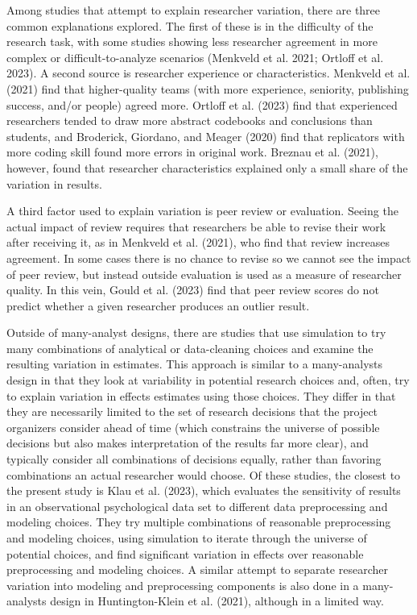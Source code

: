 \documentclass[
  letterpaper,
  DIV=11,
  numbers=noendperiod]{scrartcl}
\begin{document}
Among studies that attempt to explain researcher variation, there are
three common explanations explored. The first of these is in the
difficulty of the research task, with some studies showing less
researcher agreement in more complex or difficult-to-analyze scenarios
(Menkveld et al. 2021; Ortloff et al. 2023). A second source is
researcher experience or characteristics. Menkveld et al. (2021) find
that higher-quality teams (with more experience, seniority, publishing
success, and/or people) agreed more. Ortloff et al. (2023) find that
experienced researchers tended to draw more abstract codebooks and
conclusions than students, and Broderick, Giordano, and Meager (2020)
find that replicators with more coding skill found more errors in
original work. Breznau et al. (2021), however, found that researcher
characteristics explained only a small share of the variation in
results.

A third factor used to explain variation is peer review or evaluation.
Seeing the actual impact of review requires that researchers be able to
revise their work after receiving it, as in Menkveld et al. (2021), who
find that review increases agreement. In some cases there is no chance
to revise so we cannot see the impact of peer review, but instead
outside evaluation is used as a measure of researcher quality. In this
vein, Gould et al. (2023) find that peer review scores do not predict
whether a given researcher produces an outlier result.

Outside of many-analyst designs, there are studies that use simulation
to try many combinations of analytical or data-cleaning choices and
examine the resulting variation in estimates. This approach is similar
to a many-analysts design in that they look at variability in potential
research choices and, often, try to explain variation in effects
estimates using those choices. They differ in that they are necessarily
limited to the set of research decisions that the project organizers
consider ahead of time (which constrains the universe of possible
decisions but also makes interpretation of the results far more clear),
and typically consider all combinations of decisions equally, rather
than favoring combinations an actual researcher would choose. Of these
studies, the closest to the present study is Klau et al. (2023), which
evaluates the sensitivity of results in an observational psychological
data set to different data preprocessing and modeling choices. They try
multiple combinations of reasonable preprocessing and modeling choices,
using simulation to iterate through the universe of potential choices,
and find significant variation in effects over reasonable preprocessing
and modeling choices. A similar attempt to separate researcher variation
into modeling and preprocessing components is also done in a
many-analysts design in Huntington-Klein et al. (2021), although in a
limited way.
\end{document}
